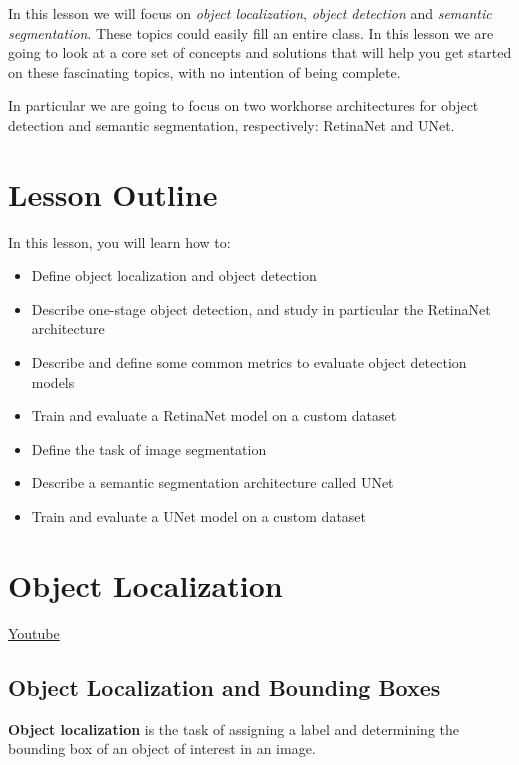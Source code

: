 In this lesson we will focus on \textit{object localization}, \textit{object detection} and \textit{semantic segmentation}. These topics could easily fill an entire class. In this lesson we are going to look at a core set of concepts and solutions that will help you get started on these fascinating topics, with no intention of being complete.\newline

In particular we are going to focus on two workhorse architectures for object detection and semantic segmentation, respectively: RetinaNet and UNet.

\section{Lesson Outline}
In this lesson, you will learn how to:

\begin{itemize}
    \item Define object localization and object detection
    \item Describe one-stage object detection, and study in particular the RetinaNet architecture
    \item Describe and define some common metrics to evaluate object detection models
    \item Train and evaluate a RetinaNet model on a custom dataset
    \item Define the task of image segmentation
    \item Describe a semantic segmentation architecture called UNet
    \item Train and evaluate a UNet model on a custom dataset
\end{itemize}

\section{Object Localization}
\href{https://www.youtube.com/watch?v=vsmhBTeNh9g&t=2s&ab_channel=Udacity}{Youtube} \newline

\subsection{Object Localization and Bounding Boxes}

\textbf{Object localization} is the task of assigning a label and determining the bounding box of an object of interest in an image.\newline

